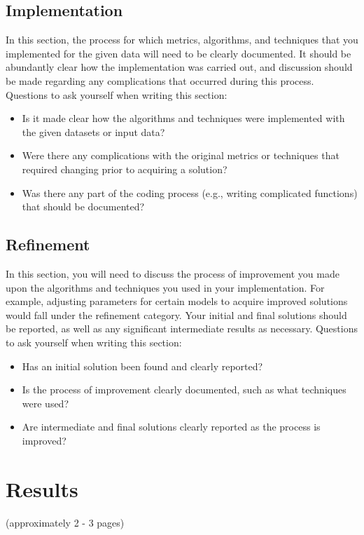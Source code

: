 \documentclass[twoside,openright,titlepage,numbers=noenddot,headinclude,%
               footinclude=true,cleardoublepage=empty,abstractoff,BCOR=5mm,%
               paper=a4,fontsize=11pt,ngerman,american]{scrreprt}
\numberwithin{theorem}{chapter}
\numberwithin{definition}{chapter}
\numberwithin{algorithm}{chapter}
\numberwithin{figure}{chapter}
\numberwithin{table}{chapter}
\numberwithin{equation}{chapter}
\begin{document}
\section*{Implementation}
In this section, the process for which metrics, algorithms, and techniques that you implemented for the given data will need to be clearly documented. It should be abundantly clear how the implementation was carried out, and discussion should be made regarding any complications that occurred during this process. Questions to ask yourself when writing this section:
\begin{itemize}%
\item Is it made clear how the algorithms and techniques were implemented with the given datasets or input data?
\item Were there any complications with the original metrics or techniques that required changing prior to acquiring a solution?
\item Was there any part of the coding process (e.g., writing complicated functions) that should be documented?
\end{itemize}


\section*{Refinement}
In this section, you will need to discuss the process of improvement you made upon the algorithms and techniques you used in your implementation. For example, adjusting parameters for certain models to acquire improved solutions would fall under the refinement category. Your initial and final solutions should be reported, as well as any significant intermediate results as necessary. Questions to ask yourself when writing this section:
\begin{itemize}%
\item Has an initial solution been found and clearly reported?
\item Is the process of improvement clearly documented, such as what techniques were used?
\item Are intermediate and final solutions clearly reported as the process is improved?
\end{itemize}

\chapter*{Results}
(approximately 2 - 3 pages)
\end{document}
